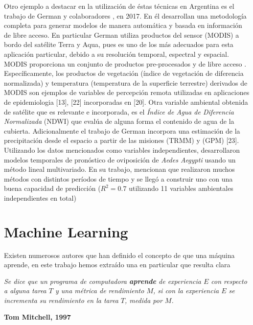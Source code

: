 \par Otro ejemplo a destacar en la utilización de éstas técnicas en Argentina es
  el trabajo de German y colaboradores \cite{german_temporal}, en 2017.
  En él desarrollan una metodología completa
  para generar modelos de manera automática y basada en información de libre
  acceso. En particular German \cite{german_temporal} utiliza productos del sensor (MODIS) a bordo
  del satélite Terra y Aqua, pues es uno de los más adecuados para esta
  aplicación particular, debido a su resolución temporal, espectral y espacial.
  MODIS proporciona un conjunto de productos pre-procesados y de libre acceso \cite{terra_aqua_modis}.
  Específicamente, los productos de vegetación (índice de vegetación de diferencia
  normalizada) y temperatura (temperatura de la superficie terrestre) derivados
  de MODIS son ejemplos de variables de percepción remota utilizadas
  en aplicaciones de epidemiologia [13], [22] incorporadas en [20]. Otra variable
  ambiental obtenida de satélite que es relevante e incorporada, es el
  \textit{Índice de Agua de Diferencia Normalizada} (NDWI) que evalúa de alguna
  forma el contenido de agua de la cubierta. Adicionalmente el trabajo de German
  incorpora una estimación de la precipitación desde el espacio a partir de las
  misiones (TRMM) y (GPM) [23].
  Utilizando los datos mencionados como variables independientes,
  desarrollaron modelos temporales de pronóstico de oviposición de \textit{Aedes Aegypti}
  usando un método lineal multivariado. En su trabajo, mencionan que
  realizaron muchos métodos con distintos períodos de tiempo y se llegó a
  construir uno con una buena capacidad de
  predicción ($R^{2} = 0.7 $ utilizando 11 variables ambientales independientes en total)


  \section{Machine Learning}

    \par Existen numerosos autores que han definido el concepto de que una máquina
      aprende, en este trabajo hemos extraído una en particular que resulta
      clara
      \begin{framed}
        \begin{center}
          \textit{Se dice que un programa de computadora \textbf{aprende} de experiencia
          $E$ con respecto a alguna tarea $T$ y una métrica de rendimiento $M$, si
          con la experiencia $E$ se incrementa su rendimiento en la tarea $T$,
          medida por $M$.}\\
        \end{center}
        \centering \textbf{Tom Mitchell, 1997} \cite{mitchell_learn}
      \end{framed}

